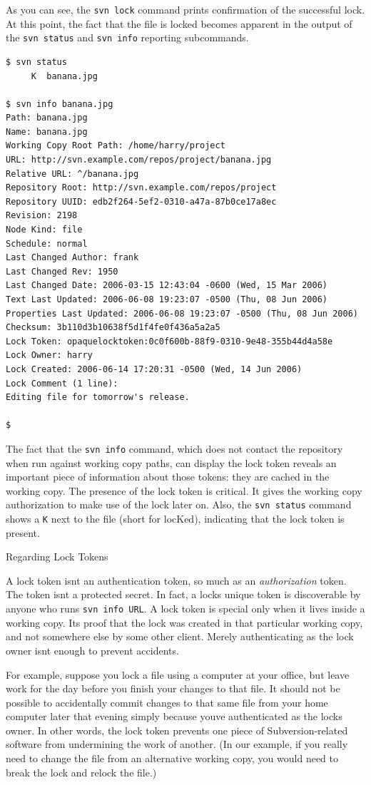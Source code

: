 As you can see, the \texttt{svn\ lock} command prints confirmation of
the successful lock. At this point, the fact that the file is locked
becomes apparent in the output of the \texttt{svn\ status} and
\texttt{svn\ info} reporting subcommands.

\begin{verbatim}
$ svn status
     K  banana.jpg

$ svn info banana.jpg
Path: banana.jpg
Name: banana.jpg
Working Copy Root Path: /home/harry/project
URL: http://svn.example.com/repos/project/banana.jpg
Relative URL: ^/banana.jpg
Repository Root: http://svn.example.com/repos/project
Repository UUID: edb2f264-5ef2-0310-a47a-87b0ce17a8ec
Revision: 2198
Node Kind: file
Schedule: normal
Last Changed Author: frank
Last Changed Rev: 1950
Last Changed Date: 2006-03-15 12:43:04 -0600 (Wed, 15 Mar 2006)
Text Last Updated: 2006-06-08 19:23:07 -0500 (Thu, 08 Jun 2006)
Properties Last Updated: 2006-06-08 19:23:07 -0500 (Thu, 08 Jun 2006)
Checksum: 3b110d3b10638f5d1f4fe0f436a5a2a5
Lock Token: opaquelocktoken:0c0f600b-88f9-0310-9e48-355b44d4a58e
Lock Owner: harry
Lock Created: 2006-06-14 17:20:31 -0500 (Wed, 14 Jun 2006)
Lock Comment (1 line):
Editing file for tomorrow's release.

$
\end{verbatim}

The fact that the \texttt{svn\ info} command, which does not contact the
repository when run against working copy paths, can display the lock
token reveals an important piece of information about those tokens: they
are cached in the working copy. The presence of the lock token is
critical. It gives the working copy authorization to make use of the
lock later on. Also, the \texttt{svn\ status} command shows a \texttt{K}
next to the file (short for locKed), indicating that the lock token is
present.

Regarding Lock Tokens

A lock token isn\textquotesingle t an authentication token, so much as
an \emph{authorization} token. The token isn\textquotesingle t a
protected secret. In fact, a lock\textquotesingle s unique token is
discoverable by anyone who runs \texttt{svn\ info\ URL}. A lock token is
special only when it lives inside a working copy. It\textquotesingle s
proof that the lock was created in that particular working copy, and not
somewhere else by some other client. Merely authenticating as the lock
owner isn\textquotesingle t enough to prevent accidents.

For example, suppose you lock a file using a computer at your office,
but leave work for the day before you finish your changes to that file.
It should not be possible to accidentally commit changes to that same
file from your home computer later that evening simply because
you\textquotesingle ve authenticated as the lock\textquotesingle s
owner. In other words, the lock token prevents one piece of
Subversion-related software from undermining the work of another. (In
our example, if you really need to change the file from an alternative
working copy, you would need to break the lock and relock the file.)

